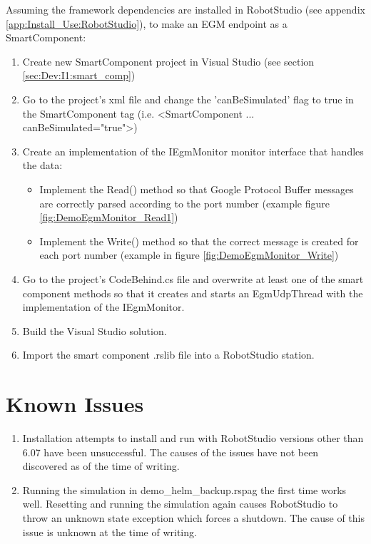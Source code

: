 \documentclass{cslthse-msc}
\begin{document}
\begin{appendices}
Assuming the framework dependencies are installed in RobotStudio (see appendix \ref{app:Install_Use:RobotStudio}), to make an EGM endpoint as a SmartComponent:
\begin{enumerate}
    \item Create new SmartComponent project in Visual Studio (see section \ref{sec:Dev:I1:smart_comp})
    \item Go to the project's xml file and change the 'canBeSimulated' flag to true in the SmartComponent tag (i.e. <SmartComponent ... canBeSimulated="true">)
    \item Create an implementation of the IEgmMonitor monitor interface that handles the data:
        \begin{itemize}
            \item Implement the Read() method so that Google Protocol Buffer messages are correctly parsed according to the port number (example figure \ref{fig:DemoEgmMonitor_Read1})
            \item Implement the Write() method so that the correct message is created for each port number (example in figure \ref{fig:DemoEgmMonitor_Write})
        \end{itemize}
    \item Go to the project's CodeBehind.cs file and overwrite at least one of the smart component methods so that it creates and starts an EgmUdpThread with the implementation of the IEgmMonitor. 
    \item Build the Visual Studio solution.
    \item  Import the smart component .rslib file into a RobotStudio station.
\end{enumerate}

\section{Known Issues}
\begin{enumerate}
    \item Installation attempts to install and run with RobotStudio versions other than 6.07 have been unsuccessful. The causes of the issues have not been discovered as of the time of writing.  
    \item Running the simulation in demo\_helm\_backup.rspag the first time works well. Resetting and running the simulation again causes RobotStudio to throw an unknown state exception which forces a shutdown. The cause of this issue is unknown at the time of writing. 
\end{enumerate}


\end{appendices}
\end{document}
